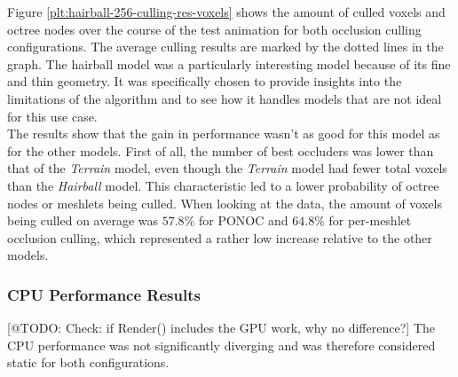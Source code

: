 \noindent
Figure \ref{plt:hairball-256-culling-res-voxels} shows the amount of culled voxels and octree nodes 
over the course of the test animation for both occlusion culling configurations. The average culling 
results are marked by the dotted lines in the graph. The hairball model was a particularly interesting 
model because of its fine and thin geometry. It was specifically chosen to provide insights into the 
limitations of the algorithm and to see how it handles models that are not ideal for this use case.\\

\noindent
The results show that the gain in performance wasn't as good for this model as for the other models.
First of all, the number of best occluders was lower than that of the \emph{Terrain} model, even though the 
\emph{Terrain} model had fewer total voxels than the \emph{Hairball} model. This characteristic led to 
a lower probability of octree nodes or meshlets being culled. When looking at the data, the amount of 
voxels being culled on average was $57.8\%$ for \ac{PONOC} and $64.8\%$ for per-meshlet 
occlusion culling, which represented a rather low increase relative to the other models. 

\subsubsection*{CPU Performance Results} \label{subsubsec-cpu-performance-results-hairball}

[@TODO: Check: if Render() includes the GPU work, why no difference?]
The \ac{CPU} performance was not significantly diverging and was therefore considered static for 
both configurations. 

